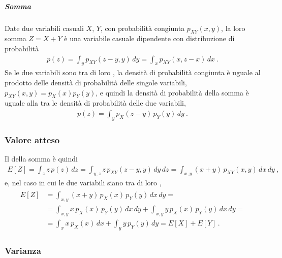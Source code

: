 \documentclass[letterpaper,10pt,italian]{jupyterBook}
\begin{document}
\subparagraph{Somma}
\label{\detokenize{ch/statistics/rv_pdf_transformations:somma}}
\sphinxAtStartPar
Date due variabili casuali \(X\), \(Y\), con probabilità congiunta \(p_{XY}(x,y)\), la loro somma \(Z = X + Y\) è una variabile casuale dipendente con distribuzione di probabilità
\begin{equation*}
\begin{split}p(z) = \int_y p_{XY}(z-y,y) \, dy = \int_{x} p_{XY}(x, z-x) \, dx \ .\end{split}
\end{equation*}
\sphinxAtStartPar
Se le due variabili sono tra di loro , la densità di probabilità congiunta è uguale al prodotto delle densità di probabilità delle singole variabili, \(p_{XY}(x,y) = p_X(x) p_Y(y)\), e quindi la densità di probabilità della somma è uguale alla  tra le densità di probabilità delle due variabili,
\begin{equation*}
\begin{split}p(z) = \int_y p_{X}(z-y) \, p_{Y}(y) \, dy \ .\end{split}
\end{equation*}\subsubsection*{Valore atteso}

\sphinxAtStartPar
Il  della somma è quindi
\begin{equation*}
\begin{split}E[Z] = \int_z z \, p(z) \, dz = \int_{y,z} z \, p_{XY}(z-y,y) \, dy \, dz =  \int_{x,y} (x+y) \, p_{XY}(x,y) \, dx \, dy \ , \end{split}
\end{equation*}
\sphinxAtStartPar
e, nel caso in cui le due variabili siano tra di loro ,
\begin{equation*}
\begin{split}\begin{aligned}
  E[Z]
  & = \int_{x,y} (x + y) \, p_X(x) \, p_Y(y) \, dx \, dy = \\
  & = \int_{x,y} x \, p_X(x) \, p_Y(y) \, dx \, dy + \int_{x,y} y \, p_X(x) \, p_Y(y) \, dx \, dy = \\
  & = \int_x x \, p_X(x) \, dx + \int_y y \, p_Y(y) \, dy = E[X] + E[Y] \ .
\end{aligned}\end{split}
\end{equation*}\subsubsection*{Varianza}
\end{document}
